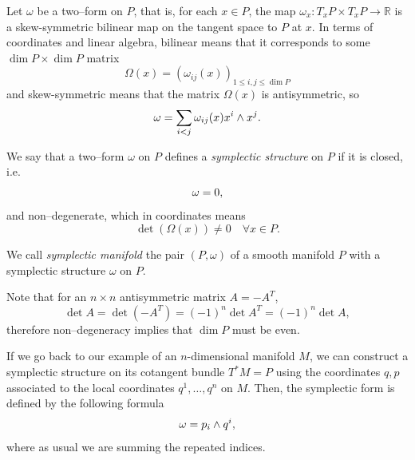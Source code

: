 \documentclass[english,fontsize=11pt,paper=a5,oneside]{scrbook}
\newcommand{\R}{\mathbb{R}}
\let\d\relax
\DeclareMathOperator{\d}{d}
\theoremstyle{definition}
\newenvironment{remark}
  {\pushQED{\qed}\renewcommand{\qedsymbol}{$\lozenge$}\remarkx}
  {\popQED\endremarkx}
\begin{document}
Let $\omega$ be a two--form on $P$, that is, for each $x\in P$, the map $\omega_x: T_x P \times T_x P \to \R$ is a skew-symmetric bilinear map on the tangent space to $P$ at $x$. In terms of coordinates and linear algebra, bilinear means that it corresponds to some $\dim P\times \dim P$ matrix 
\begin{equation}
    \Omega(x) = \left(\omega_{ij}(x)\right)_{1\leq i,j\leq \dim P}
\end{equation}
and skew-symmetric means that the matrix $\Omega(x)$ is antisymmetric, so
\begin{equation}
    \omega = \sum_{i<j} \omega_{ij}(x) \d x^i\wedge \d x^j.
\end{equation}

\begin{tcolorbox}
    We say that a two--form $\omega$ on $P$ defines a \emph{symplectic structure} on $P$ if it is closed, i.e.
    \begin{equation}
        \d\omega = 0,
    \end{equation}
    and non--degenerate, which in coordinates means
    \begin{equation}
        \det (\Omega(x)) \neq 0 \quad \forall x\in P.
    \end{equation}

    We call \emph{symplectic manifold} the pair $(P, \omega)$ of a smooth manifold $P$ with a symplectic structure $\omega$ on $P$.
\end{tcolorbox}

\begin{remark}
Note that for an $n\times n$ antisymmetric matrix $A = - A^T$,
\begin{equation}
    \det A = \det (-A^T) = (-1)^n \det A^T =  (-1)^n \det A,
\end{equation}
therefore non--degeneracy implies that $\dim P$ must be even.
\end{remark}

If we go back to our example of an $n$-dimensional manifold $M$, we can construct a symplectic structure on its cotangent bundle $T^*M = P$ using the coordinates $q,p$ associated to the local coordinates $q^1, \ldots, q^n$ on $M$.
Then, the symplectic form is defined by the following formula
\begin{equation}\label{eq:canonical2form}
    \omega = \d p_i \wedge \d q^i,
\end{equation}
where as usual we are summing the repeated indices.
\end{document}
